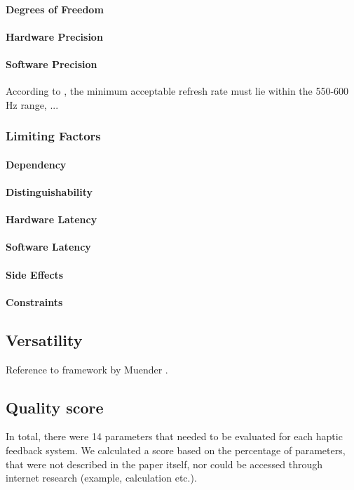 \paragraph{Degrees of Freedom}
\paragraph{Hardware Precision}
\paragraph{Software Precision}
According to \cite{Coles2011TheArt}, the minimum acceptable refresh rate must lie within the 550-600 Hz range, ... 

\subsubsection{Limiting Factors}
\paragraph{Dependency}
\paragraph{Distinguishability}
\paragraph{Hardware Latency}
\paragraph{Software Latency}
\paragraph{Side Effects}
\paragraph{Constraints}
\subsection{Versatility}
Reference to framework by Muender \cite{Muender2022HapticReality}.
\subsection{Quality score}
In total, there were 14 parameters that needed to be evaluated for each haptic feedback system. We calculated a score based on the percentage of parameters, that were not described in the paper itself, nor could be accessed through internet research (example, calculation etc.).
